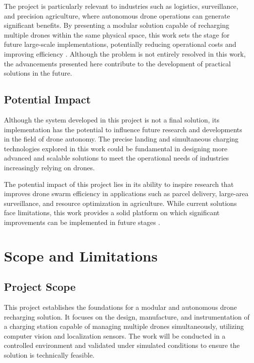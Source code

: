 The project is particularly relevant to industries such as logistics, surveillance, and precision agriculture, where autonomous drone operations can generate significant benefits. By presenting a modular solution capable of recharging multiple drones within the same physical space, this work sets the stage for future large-scale implementations, potentially reducing operational costs and improving efficiency \cite{cite1}. Although the problem is not entirely resolved in this work, the advancements presented here contribute to the development of practical solutions in the future.

\subsection{Potential Impact}

Although the system developed in this project is not a final solution, its implementation has the potential to influence future research and developments in the field of drone autonomy. The precise landing and simultaneous charging technologies explored in this work could be fundamental in designing more advanced and scalable solutions to meet the operational needs of industries increasingly relying on drones.

The potential impact of this project lies in its ability to inspire research that improves drone swarm efficiency in applications such as parcel delivery, large-area surveillance, and resource optimization in agriculture. While current solutions face limitations, this work provides a solid platform on which significant improvements can be implemented in future stages \cite{cite2}.

\section{Scope and Limitations}

\subsection{Project Scope}

This project establishes the foundations for a modular and autonomous drone recharging solution. It focuses on the design, manufacture, and instrumentation of a charging station capable of managing multiple drones simultaneously, utilizing computer vision and localization sensors. The work will be conducted in a controlled environment and validated under simulated conditions to ensure the solution is technically feasible.


